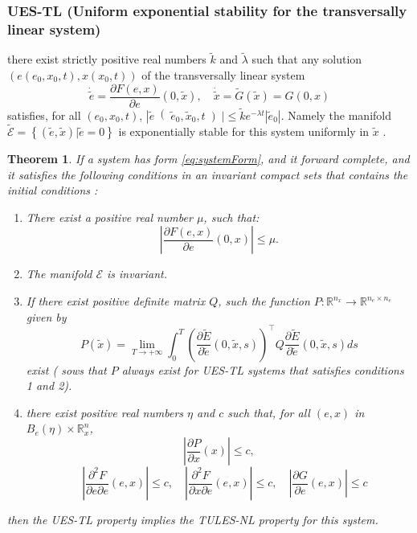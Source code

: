 \documentclass[letterpaper, 10 pt, conference]{ieeeconf}
\newtheorem{theorem}{Theorem}[section]
\begin{document}
\subsubsection{UES-TL (Uniform exponential stability for the transversally linear system)}
there exist strictly positive real numbers $\tilde{ k}$ and $\tilde{\lambda}$  such that any solution $\left(e \left(e_0, x_0, t\right), x \left(x_0, t\right)\right)$ of the transversally linear system
$$\dot{\tilde{e}} = \frac{\partial F(e,x)}{\partial e}\left(0,\tilde{x}\right) ,\quad \dot{\tilde{x}} = \tilde{G}  \left( \tilde{x}  \right) =G\left(0,x\right)$$
satisfies, for all $\left(e_0,x_0,t\right)$,   
 $ \left| \tilde{e}\right(\tilde{e}_0,\tilde{x}_0,t \left) \right| \le \tilde{k} e^{-\lambda t} \left| \tilde{e}_0\right|$. Namely the manifold $\tilde{\mathscr{E}}=\left\{\left(\tilde{e},\tilde{x} \right)| \tilde{e} = 0 \right\}$  is exponentially stable for this system uniformly in $\tilde{x}$ .

\begin{theorem}\label{therem:TULESNL2UESTL}
If a  system  has form \eqref{eq:systemForm}, and it forward complete, and it satisfies the following conditions in an invariant  compact sets that contains the initial conditions : 
\begin{enumerate}
\item 
There exist a positive real number $\mu$, such that: 
$$
\left|\frac{\partial F(e,x)}{\partial e}(0,x)\right| \le \mu. 
$$
\label{condition1}
\item 
The manifold $\mathscr{E}$ is invariant.
\label{condition2}
\item
If there exist positive definite matrix $Q$, such the function $P:\mathbb{R}^{n_x}\to\mathbb{R}^{n_e \times n_e}$ given by
$$P\left(\tilde{x}\right)=\lim_{T \to+\infty} \int_0^T \left( \frac{\partial \tilde{E}}{\partial \tilde{e}}\left(0,\tilde{x},s\right)\right)^\top Q \frac{\partial \tilde{E}}{\partial \tilde{e}}\left(0,\tilde{x},s\right) ds$$
exist (\cite{AndrieuJayawardhanaPraly} sows that $P$ always exist for UES-TL systems that satisfies conditions 1 and 2).
 \label{condition3}
\item 
there exist positive real numbers $\eta$ and $c$ such that, for all $(e,x)$ in $B_e(\eta)\times \mathbb{R}^n_x$,
$$\left| \frac{\partial P}{\partial x}(x)\right| \le c,$$
$$\quad  \left| \frac{\partial^2 F}{\partial e \partial e}(e,x)\right| \le c, \quad  \left| \frac{\partial^2 F}{\partial x \partial e}(e,x)\right| \le c,\quad\left| \frac{\partial G}{\partial e}(e,x)\right| \le c$$
\label{condition4}
\end{enumerate}
then the UES-TL property implies the TULES-NL property for this system.
\end{theorem}
\end{document}
